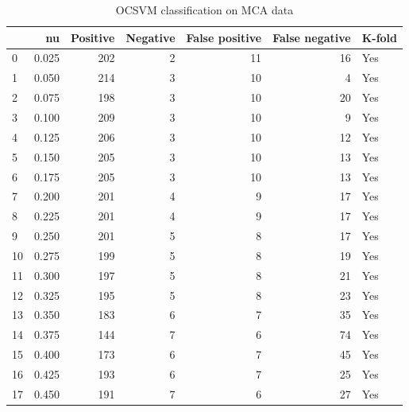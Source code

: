 \documentclass[a4paper,twoside,12pt]{book}
\begin{document}
\begin{appendices}
\begin{table}
	\centering
	\caption{OCSVM classification on MCA data}
	\label{id:tab:OCSVMonMCA}
	\begin{tabular}{lrrrrrl}
		\toprule
		{} &     nu &  Positive &  Negative &  False positive &  False negative & K-fold \\
		\midrule
		0  &  0.025 &       202 &         2 &              11 &              16 &    Yes \\
		1  &  0.050 &       214 &         3 &              10 &               4 &    Yes \\
		2  &  0.075 &       198 &         3 &              10 &              20 &    Yes \\
		3  &  0.100 &       209 &         3 &              10 &               9 &    Yes \\
		4  &  0.125 &       206 &         3 &              10 &              12 &    Yes \\
		5  &  0.150 &       205 &         3 &              10 &              13 &    Yes \\
		6  &  0.175 &       205 &         3 &              10 &              13 &    Yes \\
		7  &  0.200 &       201 &         4 &               9 &              17 &    Yes \\
		8  &  0.225 &       201 &         4 &               9 &              17 &    Yes \\
		9  &  0.250 &       201 &         5 &               8 &              17 &    Yes \\
		10 &  0.275 &       199 &         5 &               8 &              19 &    Yes \\
		11 &  0.300 &       197 &         5 &               8 &              21 &    Yes \\
		12 &  0.325 &       195 &         5 &               8 &              23 &    Yes \\
		13 &  0.350 &       183 &         6 &               7 &              35 &    Yes \\
		14 &  0.375 &       144 &         7 &               6 &              74 &    Yes \\
		15 &  0.400 &       173 &         6 &               7 &              45 &    Yes \\
		16 &  0.425 &       193 &         6 &               7 &              25 &    Yes \\
		17 &  0.450 &       191 &         7 &               6 &              27 &    Yes \\

\end{tabular}
\end{table}
\end{appendices}
\end{document}
